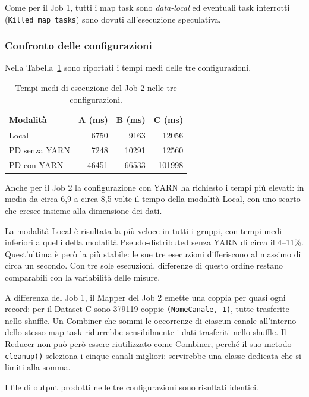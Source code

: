 \documentclass[12pt, a4paper]{article}
\begin{document}
Come per il Job 1, tutti i map task sono
\textit{data-local} ed eventuali task interrotti
(\texttt{Killed map tasks}) sono dovuti all'esecuzione
speculativa.

\subsubsection{Confronto delle configurazioni}

Nella Tabella~\ref{tab:job2confronto} sono riportati
i tempi medi delle tre configurazioni.

\begin{table}[H]
\centering
\small
\begin{tabular}{|l|r|r|r|}
\hline
\textbf{Modalità} &
\textbf{A (ms)} &
\textbf{B (ms)} &
\textbf{C (ms)} \\
\hline
Local & 6750 & 9163 & 12056 \\
PD senza YARN & 7248 & 10291 & 12560 \\
PD con YARN & 46451 & 66533 & 101998 \\
\hline
\end{tabular}
\caption{Tempi medi di esecuzione del Job 2 nelle tre configurazioni.}
\label{tab:job2confronto}
\end{table}

Anche per il Job 2 la configurazione con YARN
ha richiesto i tempi più elevati: in media da circa 6,9
a circa 8,5 volte il tempo della modalità Local,
con uno scarto che cresce insieme alla dimensione
dei dati.

La modalità Local è risultata la più veloce in tutti
i gruppi, con tempi medi inferiori a quelli della modalità
Pseudo-distributed senza YARN di circa il 4--11\%.
Quest'ultima è però la più stabile: le sue tre esecuzioni
differiscono al massimo di circa un secondo.
Con tre sole esecuzioni, differenze di questo ordine
restano comparabili con la variabilità delle misure.

A differenza del Job 1, il Mapper del Job 2 emette
una coppia per quasi ogni record: per il Dataset C
sono 379119 coppie \texttt{(NomeCanale, 1)},
tutte trasferite nello shuffle.
Un Combiner che sommi le occorrenze di ciascun canale
all'interno dello stesso map task ridurrebbe
sensibilmente i dati trasferiti nello shuffle.
Il Reducer non può però essere riutilizzato come Combiner,
perché il suo metodo \texttt{cleanup()} seleziona
i cinque canali migliori: servirebbe una classe dedicata
che si limiti alla somma.

I file di output prodotti nelle tre configurazioni
sono risultati identici.
\end{document}
